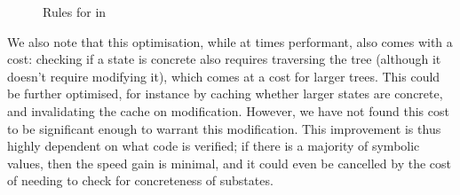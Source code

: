 \begin{figure}
	\centering
{}
\caption{Rules for  in \SplitPMap}
\label{fig:splitpmap-set-rules}
\end{figure}

We also note that this optimisation, while at times performant, also comes with a cost: checking if a state is concrete also requires traversing the tree (although it doesn't require modifying it), which comes at a cost for larger trees. This could be further optimised, for instance by caching whether larger states are concrete, and invalidating the cache on modification. However, we have not found this cost to be significant enough to warrant this modification. This improvement is thus highly dependent on what code is verified; if there is a majority of symbolic values, then the speed gain is minimal, and it could even be cancelled by the cost of needing to check for concreteness of substates.

